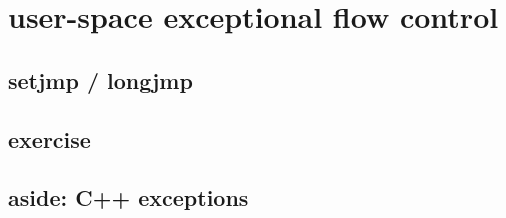 
\section{user-space exceptional flow control}
\subsection{setjmp / longjmp}



\subsection{exercise}


\subsection{aside: C++ exceptions}




